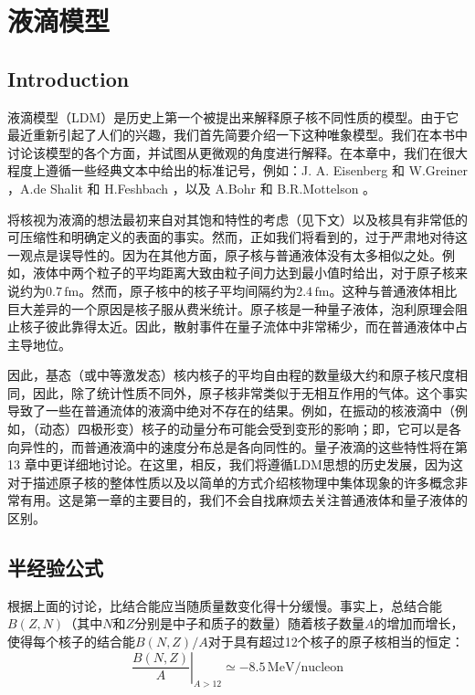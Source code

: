 
\chapter{液滴模型}

\section{Introduction}

液滴模型（LDM）是历史上第一个被提出来解释原子核不同性质的模型。由于它最近重新引起了人们的兴趣，我们首先简要介绍一下这种唯象模型。我们在本书中讨论该模型的各个方面，并试图从更微观的角度进行解释。在本章中，我们在很大程度上遵循一些经典文本中给出的标准记号，例如：J.
A. Eisenberg 和 W.Greiner \cite{EG70}，A.de Shalit 和 H.Feshbach \cite{SF74}，以及
A.Bohr 和 B.R.Mottelson \cite{BM75}。

将核视为液滴的想法最初来自对其饱和特性的考虑（见下文）以及核具有非常低的可压缩性和明确定义的表面的事实。然而，正如我们将看到的，过于严肃地对待这一观点是误导性的。因为在其他方面，原子核与普通液体没有太多相似之处。例如，液体中两个粒子的平均距离大致由粒子间力达到最小值时给出，对于原子核来说约为$0.7\,\text{fm}$。然而，原子核中的核子平均间隔约为$2.4\,\text{fm}$。这种与普通液体相比巨大差异的一个原因是核子服从费米统计。原子核是一种量子液体，泡利原理会阻止核子彼此靠得太近。因此，散射事件在量子流体中非常稀少，而在普通液体中占主导地位。 

因此，基态（或中等激发态）核内核子的平均自由程的数量级大约和原子核尺度相同，因此，除了统计性质不同外，原子核非常类似于无相互作用的气体。这个事实导致了一些在普通流体的液滴中绝对不存在的结果。例如，在振动的核液滴中（例如，（动态）四极形变）核子的动量分布可能会受到变形的影响；即，它可以是各向异性的，而普通液滴中的速度分布总是各向同性的。量子液滴的这些特性将在第
13 章中更详细地讨论。在这里，相反，我们将遵循LDM思想的历史发展，因为这对于描述原子核的整体性质以及以简单的方式介绍核物理中集体现象的许多概念非常有用。这是第一章的主要目的，我们不会自找麻烦去关注普通液体和量子液体的区别。

\section{半经验公式}

根据上面的讨论，比结合能应当随质量数变化得十分缓慢。事实上，总结合能$B(Z,N)$（其中$N$和$Z$分别是中子和质子的数量）随着核子数量$A$的增加而增长，使得每个核子的结合能$B(N,Z)/A$对于具有超过12个核子的原子核相当的恒定：
\[
\left.\frac{B(N,Z)}{A}\right|_{A>12}\simeq-8.5\,\text{MeV}/\text{nucleon}
\]

